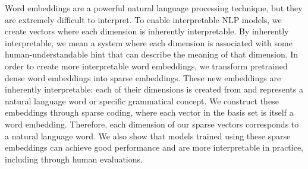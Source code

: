 Word embeddings are a powerful natural language processing technique, but they are extremely difficult to interpret. To enable interpretable NLP models, we create vectors where each dimension is inherently interpretable. By inherently interpretable, we mean a system where each dimension is associated with some human-understandable hint that can describe the meaning of that dimension. In order to create more interpretable word embeddings, we transform pretrained dense word embeddings into sparse embeddings. These new embeddings are inherently interpretable: each of their dimensions is created from and represents a natural language word or specific grammatical concept. We construct these embeddings through sparse coding, where each vector in the basis set is itself a word embedding. Therefore, each dimension of our sparse vectors corresponds to a natural language word. We also show that models trained using these sparse embeddings can achieve good performance and are more interpretable in practice, including through human evaluations.
